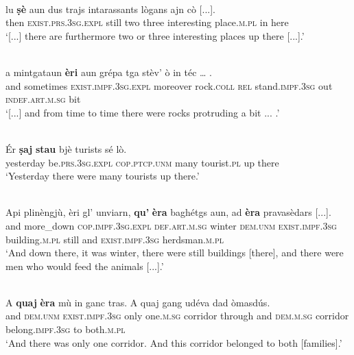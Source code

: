 \ea
\label{ex:exist.essar2}
\\
\gll [...] lu \textbf{ṣè} aun dus trajs intarassants lògans ajn cò [...].\\
{} then \textsc{exist.prs.3sg.expl} still two three interesting place.\textsc{m.pl} in here\\
\glt `[...] there are furthermore two or three interesting places up there [...].'
\z

\ea
\label{ex:exist.essar3}
\\
\gll   [...] a mintgataun \textbf{èri} aun grépa tga stèv’ ò in téc … . \\
{} and sometimes  \textsc{exist.impf.3sg.expl} moreover rock.\textsc{coll} \textsc{rel}  stand.\textsc{impf.3sg}  out \textsc{indef.art.m.sg} bit\\
\glt `[...] and from time to time there were rocks protruding a bit ... .'
\z

\ea
\label{ex:exist.essar4}
\\
\gll Ér \textbf{ṣaj} \textbf{stau} bjè turists sé lò.\\
yesterday be.\textsc{prs.3sg.expl} \textsc{cop.ptcp.unm} many tourist.\textsc{pl} up there\\
\glt `Yesterday there were many tourists up there.'
\z

\ea
\label{ex:exist.essar5}
\\
\gll    Api plinèngjù, èri gl' unviarn, \textbf{qu’} \textbf{èra} baghétgs aun, ad \textbf{èra} pravasèdars [...].\\
and more\_down \textsc{cop.impf.3sg.expl} \textsc{def.art.m.sg} winter \textsc{dem.unm} \textsc{exist.impf.3sg} building.\textsc{m.pl} still and \textsc{exist.impf.3sg} herdsman.\textsc{m.pl} \\
\glt `And down there, it was winter, there were still buildings [there], and there were men who would feed the animals [...].'
\z

\ea
\label{ex:exist.essar6}
\\
\gll    A \textbf{quaj} \textbf{èra} mù in ganc tras. A quaj gang udéva dad òmasdús.\\
and \textsc{dem.unm} \textsc{exist.impf.3sg} only one.\textsc{m.sg} corridor through and \textsc{dem.m.sg} corridor belong.\textsc{impf.3sg} to both.\textsc{m.pl}\\
\glt `And there was only one corridor. And this corridor belonged to both [families].'
\z

